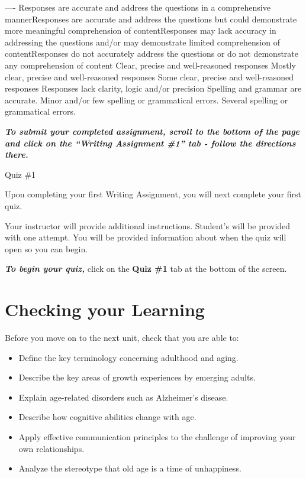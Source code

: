 \documentclass[
]{book}
\begin{document}
\begin{assessment}
\textbar\textbar--\textbar--\textbar-\textbar{}
Responses are accurate and address the questions in a comprehensive manner\textbar Responses are accurate and address the questions but could demonstrate more meaningful comprehension of content\textbar Responses may lack accuracy in addressing the questions and/or may demonstrate limited comprehension of content\textbar Responses do not accurately address the questions or do not demonstrate any comprehension of content\textbar{}
Clear, precise and well-reasoned responses\textbar{} Mostly clear, precise and well-reasoned responses \textbar Some clear, precise and well-reasoned responses \textbar{} Responses lack clarity, logic and/or precision\textbar{}
\textbar Spelling and grammar are accurate.\textbar{} Minor and/or few spelling or grammatical errors.\textbar{} Several spelling or grammatical errors.\textbar{}

\textbf{\emph{To submit your completed assignment, scroll to the bottom of the page and click on the ``Writing Assignment \#1'' tab - follow the directions there.}}

{Quiz \#1}

Upon completing your first Writing Assignment, you will next complete your first quiz.

Your instructor will provide additional instructions. Student's will be provided with one attempt. You will be provided information about when the quiz will open so you can begin.

\textbf{\emph{To begin your quiz,}} click on the \textbf{Quiz \#1} tab at the bottom of the screen.
\end{assessment}

\hypertarget{checking-your-learning-3}{%
\section*{Checking your Learning}\label{checking-your-learning-3}}

\begin{progress}
Before you move on to the next unit, check that you are able to:

\begin{itemize}
\item
  Define the key terminology concerning adulthood and aging.
\item
  Describe the key areas of growth experiences by emerging adults.
\item
  Explain age-related disorders such as Alzheimer's disease.
\item
  Describe how cognitive abilities change with age.
\item
  Apply effective communication principles to the challenge of improving your own relationships.
\item
  Analyze the stereotype that old age is a time of unhappiness.
\end{itemize}
\end{progress}
\end{document}
